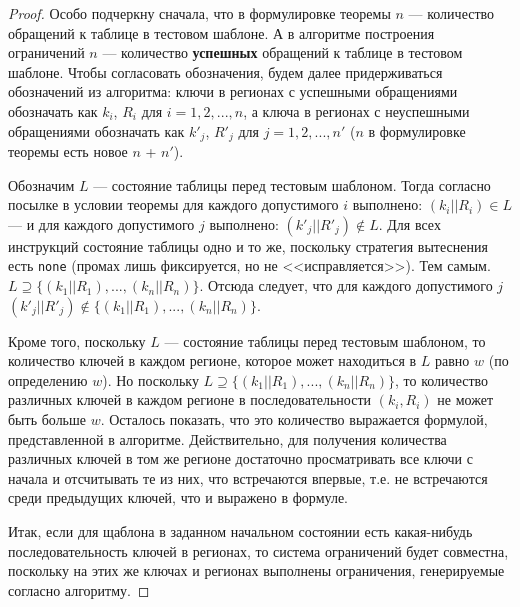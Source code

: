 \theoremtext{\ref{mirror_fullness_none}}{\FullnessMirrorNone}
\begin{proof}
  Особо подчеркну сначала, что в формулировке теоремы $n$ --- количество обращений к таблице в тестовом шаблоне. А в алгоритме построения ограничений $n$ --- количество \textbf{успешных} обращений к таблице в тестовом шаблоне. Чтобы согласовать обозначения, будем далее придерживаться обозначений из алгоритма: ключи в регионах с успешными обращениями обозначать как $k_i$, $R_i$ для $i = 1, 2, ..., n$, а ключа в регионах с неуспешными обращениями обозначать как $k'_j$, $R'_j$ для $j = 1, 2, ..., n'$ ($n$ в формулировке теоремы есть новое $n$ + $n'$).

  Обозначим $L$ --- состояние таблицы перед тестовым шаблоном. Тогда согласно посылке в условии теоремы для каждого допустимого $i$ выполнено: $(k_i || R_i) \in L$ --- и для каждого допустимого $j$ выполнено: $(k'_j || R'_j) \notin L$. Для всех инструкций состояние таблицы одно и то же, поскольку стратегия вытеснения есть \texttt{none} (промах лишь фиксируется, но не <<исправляется>>). Тем самым. $L \supseteq \{ (k_1||R_1), ..., (k_n||R_n) \}$. Отсюда следует, что для каждого допустимого $j$ $(k'_j||R'_j) \notin \{ (k_1||R_1), ..., (k_n||R_n) \}$.

  Кроме того, поскольку $L$ --- состояние таблицы перед тестовым шаблоном, то количество ключей в каждом регионе, которое может находиться в $L$ равно $w$ (по определению $w$). Но поскольку $L \supseteq \{ (k_1||R_1), ..., (k_n||R_n) \}$, то количество различных ключей в каждом регионе в последовательности $(k_i, R_i)$ не может быть больше $w$. Осталось показать, что это количество выражается формулой, представленной в алгоритме. Действительно, для получения количества различных ключей в том же регионе достаточно просматривать все ключи с начала и отсчитывать те из них, что встречаются впервые, т.е. не встречаются среди предыдущих ключей, что и выражено в формуле.

  Итак, если для щаблона в заданном начальном состоянии есть какая-нибудь последовательность ключей в регионах, то система ограничений будет совместна, поскольку на этих же ключах и регионах выполнены ограничения, генерируемые согласно алгоритму.
\end{proof}

